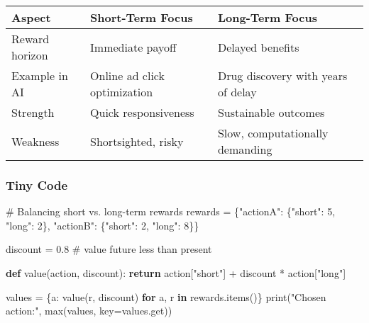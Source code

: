\documentclass[
  letterpaper,
  DIV=11,
  numbers=noendperiod]{scrreprt}
\newenvironment{Shaded}{\begin{snugshade}}{\end{snugshade}}
\newcommand{\BuiltInTok}[1]{\textcolor[rgb]{0.00,0.23,0.31}{#1}}
\newcommand{\CommentTok}[1]{\textcolor[rgb]{0.37,0.37,0.37}{#1}}
\newcommand{\ControlFlowTok}[1]{\textcolor[rgb]{0.00,0.23,0.31}{\textbf{#1}}}
\newcommand{\DecValTok}[1]{\textcolor[rgb]{0.68,0.00,0.00}{#1}}
\newcommand{\FloatTok}[1]{\textcolor[rgb]{0.68,0.00,0.00}{#1}}
\newcommand{\KeywordTok}[1]{\textcolor[rgb]{0.00,0.23,0.31}{\textbf{#1}}}
\newcommand{\NormalTok}[1]{\textcolor[rgb]{0.00,0.23,0.31}{#1}}
\newcommand{\OperatorTok}[1]{\textcolor[rgb]{0.37,0.37,0.37}{#1}}
\newcommand{\StringTok}[1]{\textcolor[rgb]{0.13,0.47,0.30}{#1}}
\begin{document}
\begin{longtable}[]{@{}
  >{\raggedright\arraybackslash}p{}
  >{\raggedright\arraybackslash}p{}
  >{\raggedright\arraybackslash}p{}@{}}
\toprule\noalign{}
\begin{minipage}[b]{\linewidth}\raggedright
Aspect
\end{minipage} & \begin{minipage}[b]{\linewidth}\raggedright
Short-Term Focus
\end{minipage} & \begin{minipage}[b]{\linewidth}\raggedright
Long-Term Focus
\end{minipage} \\
\midrule\noalign{}
\endhead
\bottomrule\noalign{}
\endlastfoot
Reward horizon & Immediate payoff & Delayed benefits \\
Example in AI & Online ad click optimization & Drug discovery with years
of delay \\
Strength & Quick responsiveness & Sustainable outcomes \\
Weakness & Shortsighted, risky & Slow, computationally demanding \\
\end{longtable}

\subsubsection{Tiny Code}\label{tiny-code-15}

\begin{Shaded}
\begin{Highlighting}[]
\CommentTok{\# Balancing short vs. long{-}term rewards}
\NormalTok{rewards }\OperatorTok{=}\NormalTok{ \{}\StringTok{"actionA"}\NormalTok{: \{}\StringTok{"short"}\NormalTok{: }\DecValTok{5}\NormalTok{, }\StringTok{"long"}\NormalTok{: }\DecValTok{2}\NormalTok{\},}
           \StringTok{"actionB"}\NormalTok{: \{}\StringTok{"short"}\NormalTok{: }\DecValTok{2}\NormalTok{, }\StringTok{"long"}\NormalTok{: }\DecValTok{8}\NormalTok{\}\}}

\NormalTok{discount }\OperatorTok{=} \FloatTok{0.8}  \CommentTok{\# value future less than present}

\KeywordTok{def}\NormalTok{ value(action, discount):}
    \ControlFlowTok{return}\NormalTok{ action[}\StringTok{"short"}\NormalTok{] }\OperatorTok{+}\NormalTok{ discount }\OperatorTok{*}\NormalTok{ action[}\StringTok{"long"}\NormalTok{]}

\NormalTok{values }\OperatorTok{=}\NormalTok{ \{a: value(r, discount) }\ControlFlowTok{for}\NormalTok{ a, r }\KeywordTok{in}\NormalTok{ rewards.items()\}}
\BuiltInTok{print}\NormalTok{(}\StringTok{"Chosen action:"}\NormalTok{, }\BuiltInTok{max}\NormalTok{(values, key}\OperatorTok{=}\NormalTok{values.get))}
\end{Highlighting}
\end{Shaded}
\end{document}
